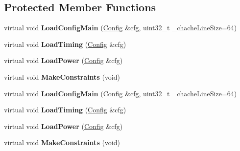 \subsection*{Protected Member Functions}
\begin{DoxyCompactItemize}
\item 
\hypertarget{classMemParam_af1c75c2ba89c790a4102e9f44ecf8e96}{virtual void {\bfseries Load\-Config\-Main} (\hyperlink{classConfig}{Config} \&cfg, uint32\-\_\-t \-\_\-chache\-Line\-Size=64)}\label{classMemParam_af1c75c2ba89c790a4102e9f44ecf8e96}

\item 
\hypertarget{classMemParam_a5f8f0797e203e3562332ca9edfc08ce0}{virtual void {\bfseries Load\-Timing} (\hyperlink{classConfig}{Config} \&cfg)}\label{classMemParam_a5f8f0797e203e3562332ca9edfc08ce0}

\item 
\hypertarget{classMemParam_a10948c6cf515ab294e27c81c518f939e}{virtual void {\bfseries Load\-Power} (\hyperlink{classConfig}{Config} \&cfg)}\label{classMemParam_a10948c6cf515ab294e27c81c518f939e}

\item 
\hypertarget{classMemParam_a6fca0941062e92c47342183545bab929}{virtual void {\bfseries Make\-Constraints} (void)}\label{classMemParam_a6fca0941062e92c47342183545bab929}

\item 
\hypertarget{classMemParam_a80ce8ccc9e00ae7fa14c15076cff332c}{virtual void {\bfseries Load\-Config\-Main} (\hyperlink{classConfig}{Config} \&cfg, uint32\-\_\-t \-\_\-chache\-Line\-Size=64)}\label{classMemParam_a80ce8ccc9e00ae7fa14c15076cff332c}

\item 
\hypertarget{classMemParam_adde946724f40655563a12fb9f36db349}{virtual void {\bfseries Load\-Timing} (\hyperlink{classConfig}{Config} \&cfg)}\label{classMemParam_adde946724f40655563a12fb9f36db349}

\item 
\hypertarget{classMemParam_ae729ff14a712b3d743af12924c999d53}{virtual void {\bfseries Load\-Power} (\hyperlink{classConfig}{Config} \&cfg)}\label{classMemParam_ae729ff14a712b3d743af12924c999d53}

\item 
\hypertarget{classMemParam_acc62823ba5b52b29debf56a2b4e07980}{virtual void {\bfseries Make\-Constraints} (void)}\label{classMemParam_acc62823ba5b52b29debf56a2b4e07980}

\end{DoxyCompactItemize}
